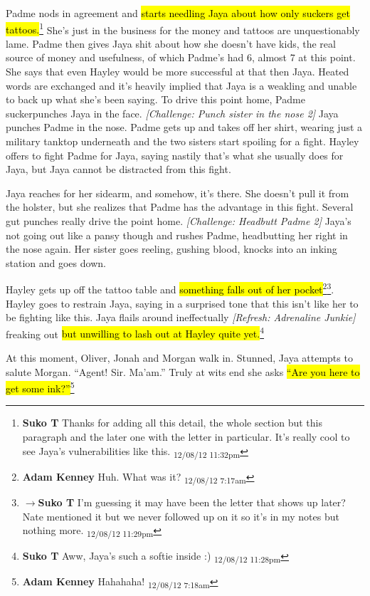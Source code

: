 Padme nods in agreement and \hl{starts needling Jaya about how only suckers get tattoos.}\footnote{\textbf{Suko T }Thanks for adding all this detail, the whole section but this paragraph and the later one with the letter in particular.  It's really cool to see Jaya's vulnerabilities like this. \textsubscript{12/08/12 11:32pm}} She's just in the business for the money and tattoos are unquestionably lame.  Padme then gives Jaya shit about how she doesn't have kids, the real source of money and usefulness, of which Padme's had 6, almost 7 at this point.  She says that even Hayley would be more successful at that then Jaya.  Heated words are exchanged and it's heavily implied that Jaya is a weakling and unable to back up what she's been saying.  To drive this point home, Padme suckerpunches Jaya in the face.  \textit{{[}Challenge: Punch sister in the nose 2{]}} \textit{ }Jaya punches Padme in the nose.  Padme gets up and takes off her shirt, wearing just a military tanktop underneath and the two sisters start spoiling for a fight.  Hayley offers to fight Padme for Jaya, saying nastily that's what she usually does for Jaya, but Jaya cannot be distracted from this fight.



Jaya reaches for her sidearm, and somehow, it's there.   She doesn't pull it from the holster, but she realizes that Padme has the advantage in this fight.  Several gut punches really drive the point home.  \textit{{[}Challenge: Headbutt Padme 2{]}}  Jaya's not going out like a pansy though and rushes Padme, headbutting her right in the nose again.  Her sister goes reeling, gushing blood, knocks into an inking station and goes down. 



Hayley gets up off the tattoo table and \hl{something falls out of her pocket}\footnote{\textbf{Adam Kenney }Huh.  What was it? \textsubscript{12/08/12 7:17am}}\footnote{$\rightarrow$\textbf{Suko T }I'm guessing it may have been the letter that shows up later?  Nate mentioned it but we never followed up on it so it's in my notes but nothing more. \textsubscript{12/08/12 11:29pm}}. Hayley goes to restrain Jaya, saying in a surprised tone that this isn't like her to be fighting like this.  Jaya flails around ineffectually \textit{{[}Refresh: Adrenaline Junkie{]} }freaking out \hl{but unwilling to lash out at Hayley quite yet.}\footnote{\textbf{Suko T }Aww, Jaya's such a softie inside :) \textsubscript{12/08/12 11:28pm}}



At this moment, Oliver, Jonah and Morgan walk in.  Stunned, Jaya attempts to salute Morgan. ``Agent!  Sir. Ma'am.''  Truly at wits end she asks \hl{``Are you here to get some ink?''}\footnote{\textbf{Adam Kenney }Hahahaha! \textsubscript{12/08/12 7:18am}}



